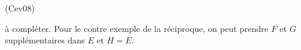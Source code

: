 \begin{tiny}(Cev08)\end{tiny} à compléter. Pour le contre exemple de la réciproque, on peut prendre $F$ et $G$ supplémentaires dans $E$ et $H=E$.